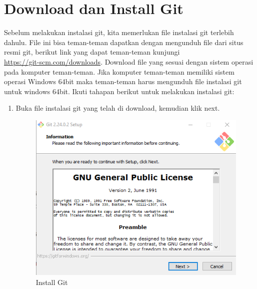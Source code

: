 \section{Download dan Install Git}
Sebelum melakukan instalasi git, kita memerlukan file instalasi git terlebih dahulu. File ini bisa teman-teman dapatkan dengan mengunduh file dari situs resmi git, berikut link yang dapat teman-teman kunjungi \\ \small \url{https://git-scm.com/downloads}. Download file yang sesuai dengan sistem operasi pada komputer teman-teman. Jika komputer teman-teman memiliki sistem operasi Windows 64bit maka teman-teman harus mengunduh file instalasi git untuk windows 64bit. Ikuti tahapan berikut untuk melakukan instalasi git:
\begin{enumerate}
\item Buka file instalasi git yang telah di download, kemudian klik next.
\begin{figure}[H]
\centering
\includegraphics[scale=.5]{figures/install_git1}
\caption{Install Git}
\label{install_git1}
\end{figure}


\end{enumerate}
